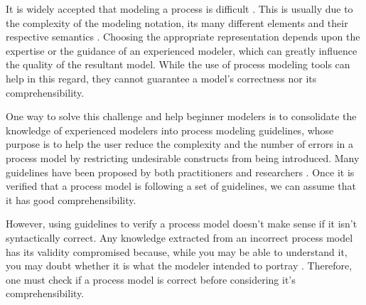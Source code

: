 \documentclass[a4paper,twoside]{article}
\begin{document}

It is widely accepted that modeling a process is difficult \cite{7PMG}. This is usually due to the complexity of the modeling notation, its many different elements and their respective semantics \cite{What we can learn from Quality Issues of BPMN Models from Industry}. Choosing the appropriate representation depends upon the expertise or the guidance of an experienced modeler, which can greatly influence the quality of the resultant model. While the use of process modeling tools can help in this regard, they cannot guarantee a model's correctness nor its comprehensibility.



One way to solve this challenge and help beginner modelers is to consolidate the knowledge of experienced modelers into process modeling guidelines, whose purpose is to help the user reduce the complexity and the number of errors in a process model by restricting undesirable constructs from being introduced. Many guidelines have been proposed by both practitioners \cite{Silver2009} \cite{White2008} \cite{Allweyer2010} and researchers \cite{Becker2000} \cite{Mendling2007} \cite{Vanderfeesten2008} \cite{Correia2012}. Once it is verified that a process model is following a set of guidelines, we can assume that it has good comprehensibility.

However, using guidelines to verify a process model doesn't make sense if it isn't syntactically correct. Any knowledge extracted from an incorrect process model has its validity compromised because, while you may be able to understand it, you may doubt whether it is what the modeler intended to portray \cite{Reijers2015}. Therefore, one must check if a process model is correct before considering it's comprehensibility.
\end{document}
